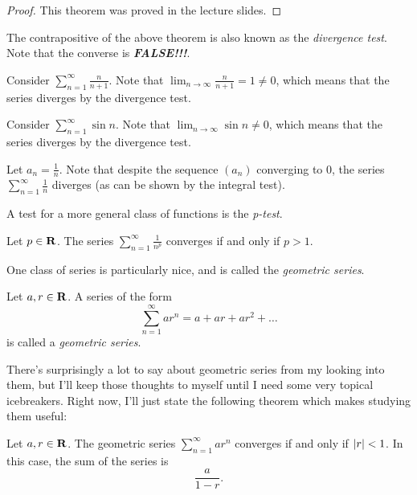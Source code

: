 \documentclass{article}
\begin{document}
    \begin{proof}
      This theorem was proved in the lecture slides.
    \end{proof}

    The contrapositive of the above theorem is also known as the \emph{divergence test}. Note that the converse is \emph{\textbf{FALSE!!!}}.
{
  \everymath{\displaystyle}
    \begin{eg}
      
      Consider \(\sum_{n=1}^{\infty} \frac{n}{n+1}\). Note that \(\lim_{n \to \infty}\frac{n}{n+1} = 1 \neq 0\), which means that the series diverges by the divergence test.
    \end{eg}

    \begin{eg}
      Consider \(\sum_{n=1}^{\infty} \sin{n}\). Note that \(\lim_{n \to \infty}\sin{n} \neq 0\), which means that the series diverges by the divergence test.
    \end{eg}

    \begin{eg}
      Let \(a_n = \frac{1}{n}\). Note that despite the sequence \((a_n)\) converging to 0, the series \(\displaystyle \sum_{n=1}^{\infty}\frac{1}{n}\) diverges (as can be shown by the integral test).
    \end{eg}
}

    A test for a more general class of functions is the \emph{p-test}.

    \begin{prop}
      \everymath{\displaystyle}
      Let \(p \in \mathbf{R}\). The series \(\sum_{n=1}^{\infty}\frac{1}{n^p}\) converges if and only if \(p > 1\).
    \end{prop}
    One class of series is particularly nice, and is called the \emph{geometric series}.

    \begin{defi}
      Let \(a, r \in \mathbf{R}\). A series of the form 
      \[
        \sum_{n=1}^{\infty}ar^n = a + ar + ar^2 + \ldots
      \]
      is called a \emph{geometric series}.
    \end{defi}

    There's surprisingly a lot to say about geometric series from my looking into them, but I'll keep those thoughts to myself until I need some very topical icebreakers. Right now, I'll just state the following theorem which makes studying them useful:

    \begin{prop}
      Let \(a, r \in \mathbf{R}\). The geometric series \(\displaystyle\sum_{n=1}^{\infty}ar^n\) converges if and only if \(\left\lvert r\right\rvert < 1\). In this case, the sum of the series is 
      \[
        \frac{a}{1-r}.
      \]
    \end{prop}
\end{document}
